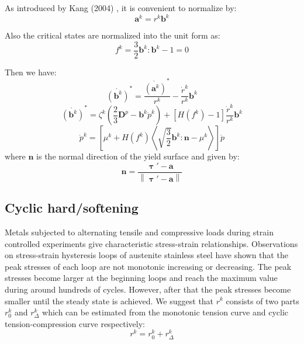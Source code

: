 As introduced by Kang (2004) \cite{kang2004visco}, it is convenient to normalize by:
\begin{equation}
\label{Equ:ak1}
{{\mathbf{a}}^k} = {r^k}{{\mathbf{b}}^k}
\end{equation}

Also the critical states are normalized into the unit form as:
\begin{equation}
{f^k} = \frac{3}{2}{{\mathbf{b}}^k}:{{\mathbf{b}}^k} - 1 = 0
\end{equation}

Then we have:
\begin{equation}
\mathring{\left({\mathbf{b}}^{k}\right)}^* = \frac{\mathring{\left({\mathbf{a}}^{k}\right)}^*}{{{r^k}}} - \frac{{{{\dot r}^k}}}{{{r^k}}}{{\mathbf{b}}^k}
\end{equation}
\begin{equation}
\mathring{\left({\mathbf{b}}^{k}\right)}^* = {\zeta ^k}\left( {\frac{2}{3}{{\mathbf{D}}^p} - {{\mathbf{b}}^k}{{\dot p}^k}} \right) + \left[ {H\left( {{f^k}} \right) - 1} \right]\frac{{{{\dot r}^k}}}{{{r^k}}}{{\mathbf{b}}^k}
\end{equation}
\begin{equation}
{\dot p^k} = \left[ {{\mu ^k} + H\left( {{f^k}} \right)\left\langle {\sqrt {\frac{3}{2}} {{\mathbf{b}}^k}:{\mathbf{n}} - {\mu ^k}} \right\rangle } \right]\dot p
\end{equation}
where ${\mathbf{n}}$ is the normal direction of the yield surface and given by:
\begin{equation}
{\mathbf{n}} = \frac{{{\bm{\uptau}'} - {\mathbf{a}}}}{{\left\| {{\bm{\uptau}}' - {\mathbf{a}}} \right\|}}
\end{equation}
\subsection{Cyclic hard/softening}
Metals subjected to alternating tensile and compressive loads during strain controlled experiments give characteristic stress-strain relationships. Observations on stress-strain hysteresis loops of austenite stainless steel have shown that the peak stresses of each loop are not monotonic increasing or decreasing. The peak stresses become larger at the beginning loops and reach the maximum value during around hundreds of cycles. However, after that the peak stresses become smaller until the steady state is achieved. We suggest that $r^k$ consists of two parts $r_0^k$ and $r_{\Delta}^k$ which can be estimated from the monotonic tension curve and cyclic tension-compression curve respectively:
\begin{equation}
\label{Equ:rk1}
{r^k} = r_0^k + r_\Delta ^k
\end{equation}

